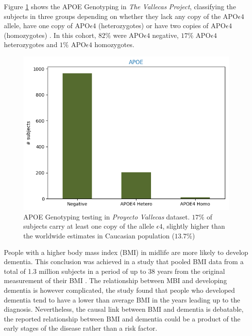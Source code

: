 \documentclass[11pt]{article}
\theoremstyle{definition}
\theoremstyle{remark}
\begin{document}
Figure \ref{fig:apoe} shows the APOE Genotyping in \emph{The Vallecas Project}, classifying the subjects in three groups depending on whether they lack any copy of the APO$\epsilon4$ allele, have one copy of APO$\epsilon4$ (heterozygotes) or have two copies of APO$\epsilon4$ (homozygotes) \cite{farrer1997effects}. In this cohort, $82\%$ were APO$\epsilon4$ negative, $17\%$ APO$\epsilon4$ heterozygotes and $1\%$ APO$\epsilon4$ homozygotes. 

\begin{figure}[H]
        \centering
        \includegraphics[keepaspectratio, width=0.6\linewidth]{figures/Fig_apoe}
        \caption{APOE Genotyping testing in \emph{Proyecto Vallecas} dataset. $17\%$ of subjects carry at least one copy of the allele $\epsilon4$, slightly higher than the worldwide estimates in Caucasian population ($13.7\%$) \cite{farrer1997effects}} 
        \label{fig:apoe}
\end{figure}


People with a higher body mass index (BMI) in midlife are more likely to develop dementia. This conclusion was achieved in a study that pooled BMI data from a total of 1.3 million subjects in a period of up to 38 years from the original measurement of their BMI \cite{kivimaki2018body}. 
The relationship between MBI and developing dementia is however complicated, the study found that people who developed dementia tend to have a lower than average BMI in the years leading up to the diagnosis. 
Nevertheless, the causal link between BMI and dementia is debatable, the reported relationship between BMI and dementia could be a product of the early stages of the disease rather than a risk factor. 
\end{document}
